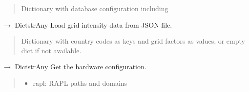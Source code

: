 \documentclass[letterpaper,10pt,english]{sphinxmanual}
\begin{document}
\begin{fulllineitems}
\begin{fulllineitems}
\begin{quote}
\begin{description}
\begin{itemize}
\end{itemize}


\sphinxAtStartPar
Dictionary with database configuration including

\end{description}\end{quote}

\end{fulllineitems}


\begin{fulllineitems}
\label{\detokenize{core.config_loader:core.config_loader.ConfigLoader.get_grid_intensity_data}}
\pysigstartsignatures
\pysiglinewithargsret
{}
{}
{{ $\rightarrow$ Dict\DUrole{p}{{[}}strAny\DUrole{p}{{]}}}}
\pysigstopsignatures
\sphinxAtStartPar
Load grid intensity data from JSON file.
\begin{quote}\begin{description}
\sphinxAtStartPar
Dictionary with country codes as keys and grid factors as values,
or empty dict if not available.

\end{description}\end{quote}

\end{fulllineitems}


\begin{fulllineitems}
\label{\detokenize{core.config_loader:core.config_loader.ConfigLoader.get_hardware_config}}
\pysigstartsignatures
\pysiglinewithargsret
{}
{}
{{ $\rightarrow$ Dict\DUrole{p}{{[}}strAny\DUrole{p}{{]}}}}
\pysigstopsignatures
\sphinxAtStartPar
Get the hardware configuration.
\begin{quote}\begin{description}
\sphinxAtStartPar
\begin{itemize}
\item {} 
\sphinxAtStartPar
rapl: RAPL paths and domains


\end{itemize}
\end{description}
\end{quote}
\end{fulllineitems}
\end{fulllineitems}
\end{document}
